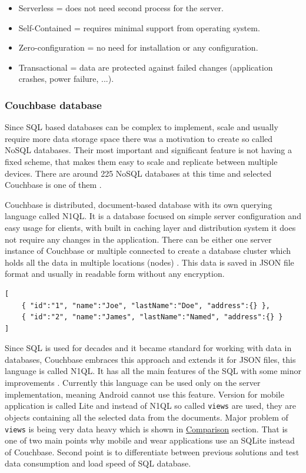 \begin{itemize}
	\item Serverless = does not need second process for the server.
	\item Self-Contained = requires minimal support from operating system.
	\item Zero-configuration = no need for installation or any configuration.
	\item Transactional = data are protected against failed changes (application crashes, power failure, ...).
\end{itemize}

\subsubsection{Couchbase database}\label{subsec:CouchbaseDatabase}
Since SQL based databases can be complex to implement, scale and usually require more data storage space there was a motivation to create so called NoSQL databases. Their most important and significant feature is not having a fixed scheme, that makes them easy to scale and replicate between multiple devices. There are around 225 NoSQL databases at this time and selected Couchbase is one of them \cite{NOSQLDB}.

Couchbase is distributed, document-based database with its own querying language called N1QL. It is a database focused on simple server configuration and easy usage for clients, with built in caching layer and distribution system it does not require any changes in the application. There can be either one server instance of Couchbase or multiple connected to create a database cluster which holds all the data in multiple locations (nodes) \cite{GSWCBS}. This data is saved in JSON file format and usually in readable form without any encryption.

\begin{lstlisting}[caption=JSON format example]
[
	{ "id":"1", "name":"Joe", "lastName":"Doe", "address":{} },
	{ "id":"2", "name":"James", "lastName":"Named", "address":{} }
]
\end{lstlisting}

Since SQL is used for decades and it became standard for working with data in databases, Couchbase embraces this approach and extends it for JSON files, this language is called N1QL. It has all the main features of the SQL with some minor improvements \cite{WINQL}. Currently this language can be used only on the server implementation, meaning Android cannot use this feature. Version for mobile application is called Lite and instead of N1QL so called \verb|views| are used, they are objects containing all the selected data from the documents. Major problem of \verb|views| is being very data heavy which is shown in \hyperref[subsubsec:Comparison]{Comparison} section. That is one of two main points why mobile and wear applications use an SQLite instead of Couchbase. Second point is to differentiate between previous solutions and test data consumption and load speed of SQL database.

